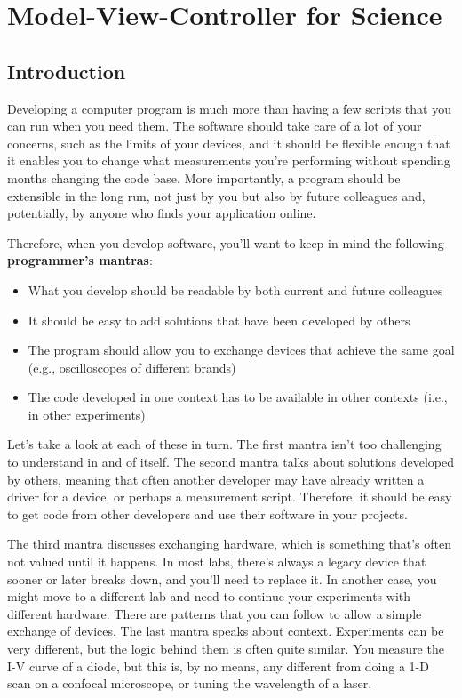 \chapter{Model-View-Controller for Science}\label{ch:mvcs}

\section{Introduction}\label{sec:mvc-introduction}
Developing a computer program is much more than having a few scripts that you can run when you need them. The software should take care of a lot of your concerns, such as the limits of your devices, and it should be flexible enough that it enables you to change what measurements you're performing without spending months changing the code base. More importantly, a program should be extensible in the long run, not just by you but also by future colleagues and, potentially, by anyone who finds your application online.

Therefore, when you develop software, you'll want to keep in mind the following \textbf{programmer's mantras}:

\begin{itemize}
\item What you develop should be readable by both current and future colleagues
\item It should be easy to add solutions that have been developed by others
\item The program should allow you to exchange devices that achieve the same goal (e.g., oscilloscopes of different brands)
\item The code developed in one context has to be available in other contexts (i.e., in other experiments)
\end{itemize}

Let's take a look at each of these in turn. The first mantra isn't too challenging to understand in and of itself. The second mantra talks about solutions developed by others, meaning that often another developer may have already written a driver for a device, or perhaps a measurement script. Therefore, it should be easy to get code from other developers and use their software in your projects.

The third mantra discusses exchanging hardware, which is something that's often not valued until it happens. In most labs, there's always a legacy device that sooner or later breaks down, and you'll need to replace it. In another case, you might move to a different lab and need to continue your experiments with different hardware. There are patterns that you can follow to allow a simple exchange of devices. The last mantra speaks about context. Experiments can be very different, but the logic behind them is often quite similar. You measure the I-V curve of a diode, but this is, by no means, any different from doing a 1-D scan on a confocal microscope, or tuning the wavelength of a laser.

